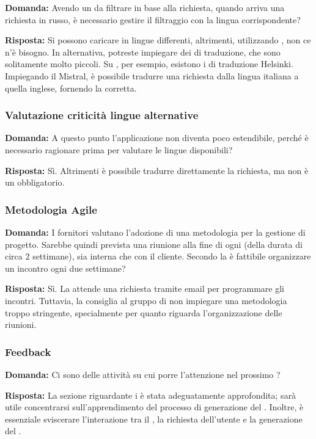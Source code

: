\textbf{Domanda:} Avendo un  da filtrare in base alla richiesta, quando arriva una richiesta in russo, è necessario gestire il filtraggio con la lingua corrispondente?

\textbf{Risposta:} Si possono caricare  in lingue differenti, altrimenti, utilizzando , non ce n'è bisogno. In alternativa, potreste impiegare dei  di traduzione, che sono solitamente molto piccoli. Su , per esempio, esistono i  di traduzione Helsinki.
Impiegando il  Mistral, è possibile tradurre una richiesta dalla lingua italiana a quella inglese, fornendo la   corretta.

\subsubsection{Valutazione criticità lingue alternative}

\textbf{Domanda:} A questo punto l'applicazione non diventa poco estendibile, perché è necessario ragionare prima per valutare le lingue disponibili?

\textbf{Risposta:} Sì. Altrimenti è possibile tradurre direttamente la richiesta, ma non è un  obbligatorio.

\subsubsection{Metodologia Agile}

\textbf{Domanda:} I fornitori valutano l’adozione di una metodologia  per la gestione di progetto. Sarebbe quindi prevista una riunione alla fine di ogni  (della durata di circa 2 settimane), sia interna che con il cliente. Secondo la  è fattibile organizzare un incontro ogni due settimane?

\textbf{Risposta:} Sì. La  attende una richiesta tramite email per programmare gli incontri. 
Tuttavia, la  consiglia al gruppo di non impiegare una metodologia troppo stringente, specialmente per quanto riguarda l'organizzazione delle riunioni.
\subsubsection{Feedback}

\textbf{Domanda:} Ci sono delle attività su cui porre l'attenzione nel prossimo ?

\textbf{Risposta:} La sezione riguardante i  è stata adeguatamente approfondita; sarà utile concentrarsi sull'apprendimento del processo di generazione del .
Inoltre, è essenziale sviscerare l'interazione tra il , la richiesta dell'utente e la generazione del .